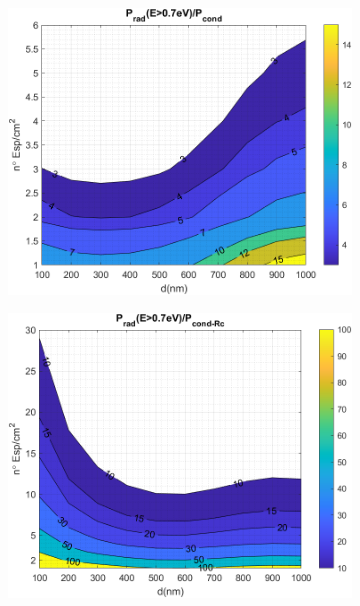 \begin{figure}[H]
	\centering
	\begin{subfigure}[b]{0.49\textwidth}
		\centering
		\includegraphics[width=1.00\textwidth]{figuras/Resultados/RelacionCondRad/SiGe.png}
		\caption{ }
		\label{fig:rel_SiSiO2Ge}
	\end{subfigure}
	\hfill
	\begin{subfigure}[b]{0.49\textwidth}
			\centering
			\includegraphics[width=1.00\textwidth]{figuras/Resultados/RelacionCondRad/SiGe_Rc.png}
			\caption{ }

\end{subfigure}
\end{figure}
